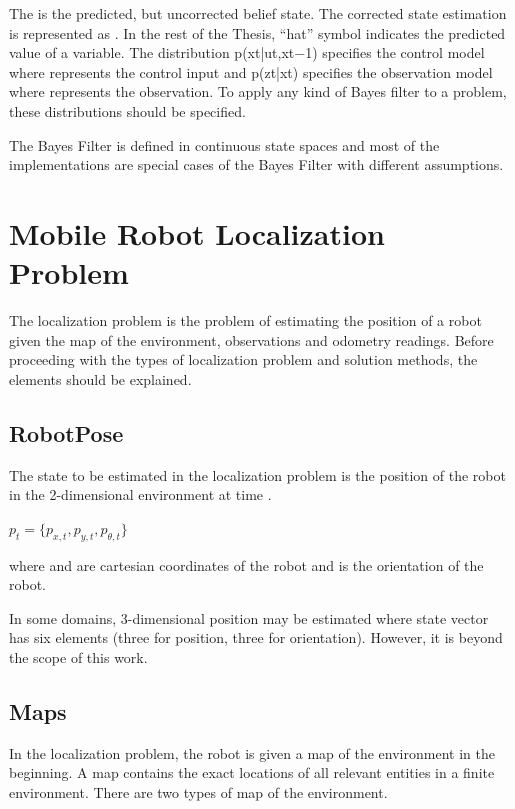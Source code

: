 The  is the predicted, but uncorrected belief state. The corrected state estimation is represented as . In the rest of the Thesis, “hat” symbol indicates the predicted value of a variable. The distribution p(xt|ut,xt−1) specifies the control model where  represents the control input and p(zt|xt) specifies the observation model where  represents the observation. To apply any kind of Bayes filter to a problem, these distributions should be specified.

The Bayes Filter is defined in continuous state spaces and most of the implementations are special cases of the Bayes Filter with different assumptions.

\section{Mobile Robot Localization Problem}
The localization problem is the problem of estimating the position of a robot given the map of the environment, observations and odometry readings. Before proceeding with the types of localization problem and solution methods, the elements should be explained.

\subsection{RobotPose}
The state to be estimated in the localization problem is the position of the robot in the 2-dimensional environment at time .

$p_{t} = \{p_{x,t},p_{y,t},p_{\theta,t}\}$

where  and  are cartesian coordinates of the robot and  is the orientation of the robot.

In some domains, 3-dimensional position may be estimated where state vector has six elements (three for position, three for orientation). However, it is beyond the scope of this work.

\subsection{Maps}
In the localization problem, the robot is given a map of the environment in the beginning. A map contains the exact locations of all relevant entities in a finite environment. There are two types of map of the environment.

